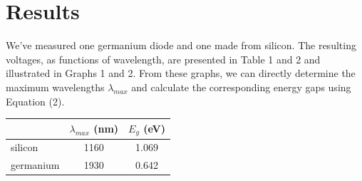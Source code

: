 \documentclass[a4paper,11pt]{article}
\begin{document}
\section{Results}

We've measured one germanium diode and one made from silicon. The resulting voltages, as functions of wavelength, are presented in Table 1 and 2 and illustrated in Graphs 1 and 2. From these graphs, we can directly determine the maximum wavelengths $ \lambda_{max} $ and calculate the corresponding energy gaps using Equation (2).

\begin{table}[htpb]
    \centering
    \begin{tabular}{l c c}
        & $ \lambda_{max} $ (nm) & $ E_g $ (eV) \\ \hline
        silicon & 1160 & 1.069 \\
        germanium & 1930 &  0.642 \\ 
    \end{tabular}
\end{table}
\end{document}
